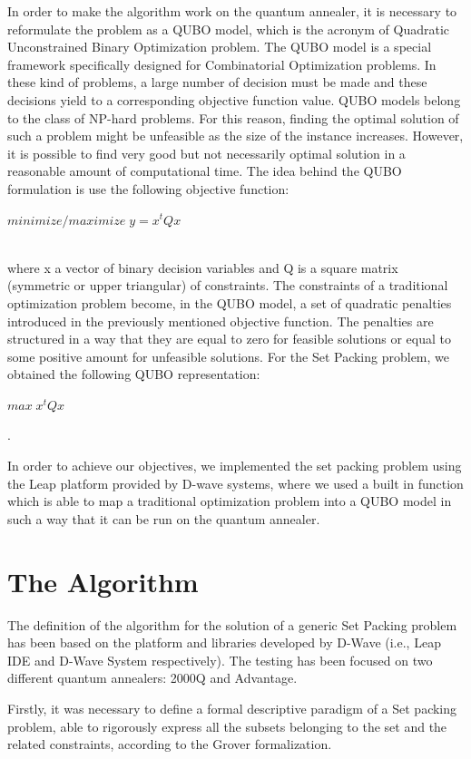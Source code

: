 \documentclass[oneside,a4paper]{article}
\begin{document}
\setlength\parindent{10pt}In order to make the algorithm work on the quantum annealer, it is necessary to reformulate the problem as a QUBO model, which is the acronym of Quadratic Unconstrained Binary Optimization problem. The QUBO model is a special framework specifically designed for Combinatorial Optimization problems. In these kind of problems, a large number of decision must be made and these decisions yield to a corresponding objective function value. QUBO models belong to the class of NP-hard problems. For this reason, finding the optimal solution of such a problem might be unfeasible as the size of the instance increases. However, it is possible to find very good but not necessarily optimal solution in a reasonable amount of computational time.
The idea behind the QUBO formulation is use the following objective function:\\
\centerline{${minimize/maximize\; y = x^tQx}$}\\
where x a vector of binary decision variables and Q is a square matrix (symmetric or upper triangular) of constraints. The constraints of a traditional optimization problem become, in the QUBO model, a set of quadratic penalties introduced in the previously mentioned objective function. The penalties are structured in a way that they are equal to zero for feasible solutions or equal to some positive amount for unfeasible solutions. For the Set Packing problem, we obtained the following QUBO representation: \centerline{${max\; x^tQx}$}.

In order to achieve our objectives, we implemented the set packing problem using the Leap platform provided by D-wave systems, where we used a built in function which is able to map a traditional optimization problem into a QUBO model in such a way that it can be run on the quantum annealer.

\section{The Algorithm}
The definition of the algorithm for the solution of a generic Set Packing problem has been based on the platform and libraries developed by D-Wave (i.e., Leap IDE \cite{WebSite8} and D-Wave System \cite{WebSite5} respectively). The testing has been focused on two different quantum annealers: 2000Q and Advantage.

Firstly, it was necessary to define a formal descriptive paradigm of a Set packing problem, able to rigorously express all the subsets belonging to the set and the related constraints, according to the Grover formalization. 
\end{document}

